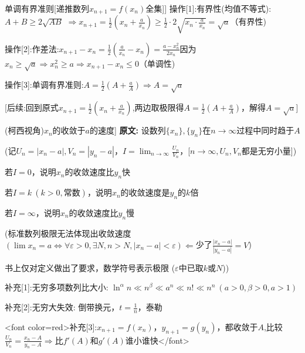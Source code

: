 \documentclass[11pt,a4paper,UTF8]{ctexart}
\begin{document}
\begin{thmbox}[[5]单调有界准则[递推数列$x_{n+1} = f(x_n)$全集]]
  操作[1]:有界性(均值不等式):$A+B \ge 2\sqrt{AB}$		$\Rightarrow x_{n+1} = \frac{1}{2}(x_n + \frac{a}{x_n}) \ge \frac{1}{2} \cdot 2\sqrt{x_n \cdot \frac{a}{x_n}} = \sqrt{a}$（有界性)

  操作[2]:作差法:$x_{n+1} - x_n = \frac{1}{2}(\frac{a}{x_n} - x_n) = \frac{a - x_n^2}{2x_n}$因为$x_n \ge \sqrt{a} \Rightarrow x_n^2 \ge a \Rightarrow x_{n+1} - x_n \le 0$（单调性)

  操作[3]:单调有界准则:$A = \frac{1}{2}(A + \frac{a}{A}) \Rightarrow A = \sqrt{a}$

  [后续:回到原式$x_{n+1} = \frac{1}{2}(x_n + \frac{a}{x_n})$,两边取极限得$A = \frac{1}{2}(A + \frac{a}{A})$，解得$A = \sqrt{a}$]

\end{thmbox}
\begin{thmbox}[[6](柯西视角)${x_n}$的收敛于$a$的速度]
\textbf{原文:} 设数列$\{x_n\}, \{y_n\}$在$n \to \infty$过程中同时趋于$A$

(记$U_n=|x_n-a|, V_n=|y_n-a|$，$I = \lim_{n \to \infty} \frac{U_n}{V_n}$，[$n \to \infty, U_n, V_n$都是无穷小量])

若$I=0$，说明$x_n$的收敛速度比$y_n$快	

若$I=k\ (k>0, \text{常数})$，说明$x_n$的收敛速度是$y_n$的$k$倍

若$I=\infty$，说明$x_n$的收敛速度比$y_n$慢

(标准数列极限无法体现出收敛速度$(\lim x_n=a \Leftrightarrow \forall \varepsilon>0, \exists N, n>N, |x_n-a|<\varepsilon) \Leftarrow$少了$\frac{|x_n-a|}{|y_n-a|}=V$)

  书上仅对定义做出了要求，数学符号表示极限 ($\varepsilon$中已取$k$或$N$))

补充[1]:无穷多项数列比大小:	$\ln^\alpha n \ll n^\beta \ll a^n \ll n! \ll n^n\ (a>0, \beta>0, a>1)$

补充[2]:无穷大失效: 	      倒带换元，$t=\frac{1}{n}$，泰勒

<font color=red>补充[3]:$x_{n+1}=f(x_n)$，$y_{n+1}=g(y_n)$，都收敛于$A$,比较$\frac{U_n}{V_n} = \frac{x_n-A}{y_n-A} \Rightarrow$比$f'(A)$和$g'(A)$谁小谁快</font>

\end{thmbox}
\end{document}
